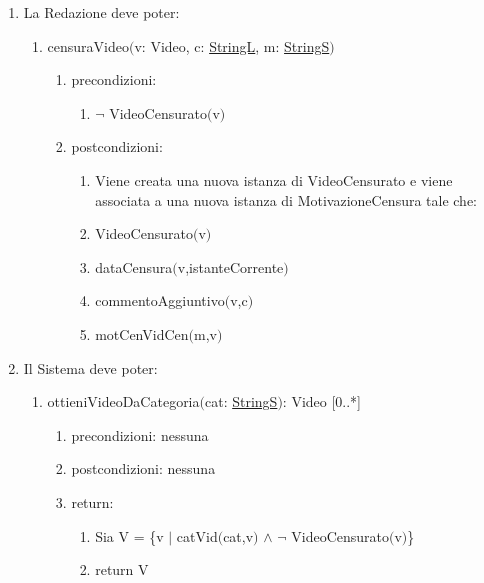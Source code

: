 \documentclass{article}
\begin{document}
\begin{enumerate}
\begin{enumerate}
    \end{enumerate}
    \item\label{sec:OperazioniRedazione} La Redazione deve poter:
    \begin{enumerate}
        \item censuraVideo$($v: Video, c: \hyperref[sec:TipoStringL]{StringL}, m: \hyperref[sec:TipoStringS]{StringS}$)$
        \begin{enumerate}
            \item precondizioni:
            \begin{enumerate}
                \item $\neg$ VideoCensurato$($v$)$
            \end{enumerate}
            \item postcondizioni:
            \begin{enumerate}
                \item Viene creata una nuova istanza di VideoCensurato e viene associata a una nuova istanza di MotivazioneCensura tale che:
                \item VideoCensurato$($v$)$
                \item dataCensura$($v,istanteCorrente$)$
                \item commentoAggiuntivo$($v,c$)$
                \item motCenVidCen$($m,v$)$
            \end{enumerate}
        \end{enumerate}
    \end{enumerate}
    \item\label{sec:OperazioniSistema} Il Sistema deve poter:
    \begin{enumerate}
        \item ottieniVideoDaCategoria$($cat: \hyperref[sec:TipoStringS]{StringS}$)$: Video [0..*]
        \begin{enumerate}
            \item precondizioni: nessuna
            \item postcondizioni: nessuna
            \item return:
            \begin{enumerate}
                \item Sia V = \{v $|$ catVid$($cat,v$)$ $\land$ $\neg$ VideoCensurato$($v$)$\}
                \item return V
            \end{enumerate}
        \end{enumerate}

\end{enumerate}
\end{enumerate}
\end{document}
